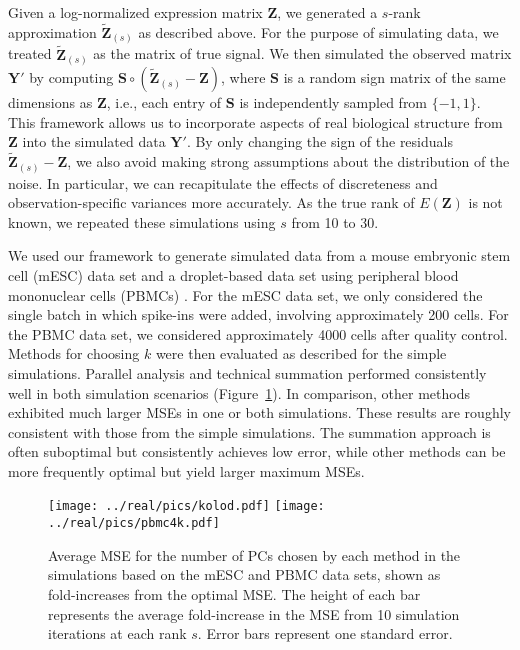 \documentclass[10pt,letterpaper]{article}
\begin{document}
Given a log-normalized expression matrix $\mathbf{Z}$, we generated a $s$-rank approximation $\mathbf{\tilde Z}_{(s)}$ as described above.
For the purpose of simulating data, we treated $\mathbf{\tilde Z}_{(s)}$ as the matrix of true signal.
We then simulated the observed matrix $\mathbf{Y}'$ by computing $\mathbf{S} \circ (\mathbf{\tilde Z}_{(s)} - \mathbf{Z})$,
where $\mathbf{S}$ is a random sign matrix of the same dimensions as $\mathbf{Z}$, i.e., each entry of $\mathbf{S}$ is independently sampled from $\{-1, 1\}$.
This framework allows us to incorporate aspects of real biological structure from $\mathbf{Z}$ into the simulated data $\mathbf{Y}'$.
By only changing the sign of the residuals $\mathbf{\tilde Z}_{(s)} - \mathbf{Z}$, we also avoid making strong assumptions about the distribution of the noise.
In particular, we can recapitulate the effects of discreteness and observation-specific variances more accurately.
As the true rank of $E(\mathbf{Z})$ is not known, we repeated these simulations using $s$ from 10 to 30.


We used our framework to generate simulated data from a mouse embryonic stem cell (mESC) data set \cite{kolod2015single} and a droplet-based data set using peripheral blood mononuclear cells (PBMCs) \cite{zheng2017massively}.
For the mESC data set, we only considered the single batch in which spike-ins were added, involving approximately 200 cells.
For the PBMC data set, we considered approximately 4000 cells after quality control.
Methods for choosing $k$ were then evaluated as described for the simple simulations.
Parallel analysis and technical summation performed consistently well in both simulation scenarios (Figure~\ref{fig:real}).
In comparison, other methods exhibited much larger MSEs in one or both simulations.
These results are roughly consistent with those from the simple simulations.
The summation approach is often suboptimal but consistently achieves low error, while other methods can be more frequently optimal but yield larger maximum MSEs.

\begin{figure}[btp]
\begin{center}
\texttt{[image: ../real/pics/kolod.pdf]}
\texttt{[image: ../real/pics/pbmc4k.pdf]}
\end{center}
\caption{Average MSE for the number of PCs chosen by each method in the simulations based on the mESC and PBMC data sets, shown as fold-increases from the optimal MSE.
The height of each bar represents the average fold-increase in the MSE from 10 simulation iterations at each rank $s$.
Error bars represent one standard error.}
\label{fig:real}
\end{figure}
\end{document}
